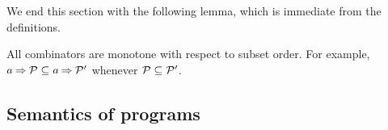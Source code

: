 We end this section with the following lemma, which is immediate from the definitions.
\begin{lemma}
  \label{lem:monotone}
  All combinators are monotone with respect to subset order.  For example, 
  $a\mathbin\Rightarrow\mathcal{P} \subseteq a\mathbin\Rightarrow\mathcal{P}'$ whenever
  $\mathcal{P}\subseteq\mathcal{P}'$.
\end{lemma}

\subsection{Semantics of programs}
\label{sec:semantics}


